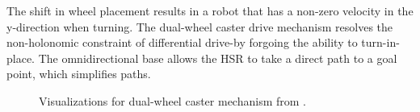 \documentclass[11pt]{article}
\begin{document}
            The shift in wheel placement results in a robot that has a non-zero velocity in the y-direction when turning. The dual-wheel caster drive mechanism resolves the non-holonomic constraint of differential drive-by forgoing the ability to turn-in-place. The omnidirectional base allows the HSR to take a direct path to a goal point, which simplifies paths.

            \begin{figure}[ht]
                \centering
                \quad
                \caption{Visualizations for dual-wheel caster mechanism from \cite{wada_caster_2000}.}
                \label{fig:dwc}
            \end{figure}
\end{document}
